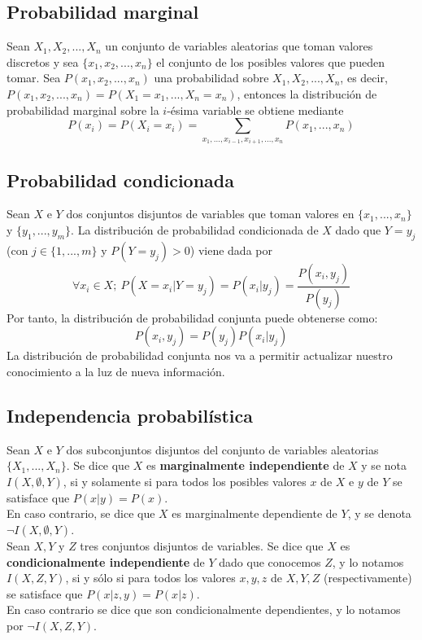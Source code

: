 \documentclass{article}
\theoremstyle{definition_wo_parentheses}
\begin{document}
\subsection{Probabilidad marginal}
Sean $X_1,X_2,...,X_n$ un conjunto de variables aleatorias que toman valores discretos y sea $\{x_1,x_2,...,x_n\}$ el conjunto de los posibles valores que pueden tomar. Sea $P(x_1,x_2,...,x_n)$ una probabilidad sobre $X_1,X_2,...,X_n$, es decir, $P(x_1,x_2,...,x_n) = P(X_1 = x_1,...,X_n=x_n)$, entonces la distribución de probabilidad marginal sobre la $i$-ésima variable se obtiene mediante
\[	P(x_i) = P(X_i=x_i) = \sum_{x_1,...,x_{i-1},x_{i+1},...,x_n}P(x_1,...,x_n)	\]

\subsection{Probabilidad condicionada}
Sean $X$ e $Y$ dos conjuntos disjuntos de variables que toman valores en $\{x_1,...,x_n\}$ y $\{y_1,...,y_m\}$. La distribución de probabilidad condicionada de $X$ dado que $Y=y_j$ (con $j \in \{1,...,m\}$ y $P(Y=y_j)>0$) viene dada por
\[	\forall x_i \in X;\ P(X=x_i|Y=y_j)=P(x_i|y_j)=\frac{P(x_i,y_j)}{P(y_j)}	\]
Por tanto, la distribución de probabilidad conjunta puede obtenerse como:
\[	P(x_i,y_j)=P(y_j)P(x_i|y_j)	\]
La distribución de probabilidad conjunta nos va a permitir actualizar nuestro conocimiento a la luz de nueva información.

\subsection{Independencia probabilística}
Sean $X$ e $Y$ dos subconjuntos disjuntos del conjunto de variables aleatorias $\{X_1,...,X_n\}$. Se dice que $X$ es \textbf{marginalmente independiente} de $X$ y se nota $I(X,\emptyset,Y)$, si y solamente si para todos los posibles valores $x$ de $X$ e $y$ de $Y$ se satisface que $P(x|y)=P(x)$.\\
En caso contrario, se dice que $X$ es marginalmente dependiente de $Y$, y se denota $\neg I(X,\emptyset,Y)$.\\

Sean $X, Y$ y $Z$ tres conjuntos disjuntos de variables. Se dice que $X$ es \textbf{condicionalmente independiente} de $Y$ dado que conocemos $Z$, y lo notamos $I(X,Z,Y)$, si y sólo si para todos los valores $x,y,z$ de $X,Y,Z$ (respectivamente) se satisface que $P(x|z,y)=P(x|z)$.\\
En caso contrario se dice que son condicionalmente dependientes, y lo notamos por $\neg I(X,Z,Y)$.
\end{document}
